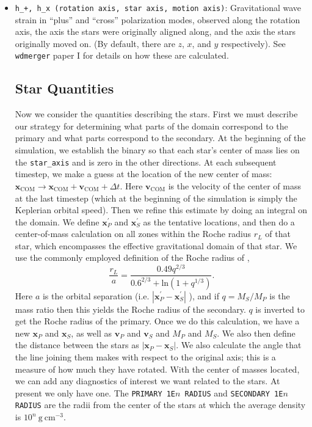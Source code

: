 \documentclass[12pt]{book}
\begin{document}
\begin{itemize}
  \item \texttt{h\_+, h\_x (rotation axis, star axis, motion axis)}: Gravitational wave strain in ``plus'' and ``cross'' polarization modes, observed along the rotation axis, the axis the stars were originally aligned along, and the axis the stars originally moved on. (By default, there are $z$, $x$, and $y$ respectively). See \texttt{wdmerger} paper I for details on how these are calculated.



  \subsection{Star Quantities}

  Now we consider the quantities describing the stars. First we must describe our strategy for determining what parts of the domain correspond to the primary and what parts correspond to the secondary. At the beginning of the simulation, we establish the binary so that each star's center of mass lies on the \texttt{star\_axis} and is zero in the other directions. At each subsequent timestep, we make a guess at the location of the new center of mass: $\mathbf{x}_{\text{COM}} \to \mathbf{x}_{\text{COM}} + \mathbf{v}_{\text{COM}} + \Delta t$. Here $\mathbf{v}_{\text{COM}}$ is the velocity of the center of mass at the last timestep (which at the beginning of the simulation is simply the Keplerian orbital speed). Then we refine this estimate by doing an integral on the domain. We define $\mathbf{x}^\prime_P$ and $\mathbf{x}^\prime_S$ as the tentative locations, and then do a center-of-mass calculation on all zones within the Roche radius $r_L$ of that star, which encompasses the effective gravitational domain of that star. We use the commonly employed definition of the Roche radius of \citet{eggleton:1983},
  \begin{equation}
    \frac{r_L}{a} = \frac{0.49 q^{2/3}}{0.6^{2/3} + \text{ln}(1 + q^{1/3})}.
  \end{equation}
  Here $a$ is the orbital separation (i.e. $\left|\mathbf{x}^\prime_P - \mathbf{x}^\prime_S\right|$ ), and if $q = M_S / M_P$ is the mass ratio then this yields the Roche radius of the secondary. $q$ is inverted to get the Roche radius of the primary. Once we do this calculation, we have a new $\mathbf{x}_P$ and $\mathbf{x}_S$, as well as $\mathbf{v}_P$ and $\mathbf{v}_S$ and $M_P$ and $M_S$. We also then define the distance between the stars as $|\mathbf{x}_P - \mathbf{x}_S|$. We also calculate the angle that the line joining them makes with respect to the original axis; this is a measure of how much they have rotated. With the center of masses located, we can add any diagnostics of interest we want related to the stars. At present we only have one. The \texttt{PRIMARY 1E$n$ RADIUS} and \texttt{SECONDARY 1E$n$ RADIUS} are the radii from the center of the stars at which the average density is $10^n\ \text{g}\ \text{cm}^{-3}$.

\end{itemize}
\end{document}
